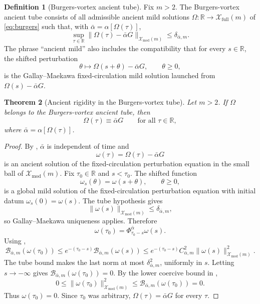 \documentclass[11pt]{amsart}
\theoremstyle{plain}
\newtheorem{theorem}{Theorem}[section]
\theoremstyle{definition}
\newtheorem{definition}[theorem]{Definition}
\theoremstyle{remark}
\numberwithin{equation}{section}
\begin{document}
\begin{definition}[Burgers-vortex ancient tube]\label{def:bv-tube}
Fix \(m>2\).  The Burgers-vortex ancient tube consists of all admissible
ancient mild solutions \(\Omega:\mathbb R\to\mathcal X_{\mathrm{full}}(m)\) of
\eqref{eq:burgers} such that, with
\(\bar\alpha=\alpha[\Omega(\tau)]\),
\[
   \sup_{\tau\in\mathbb R}
   \|\Omega(\tau)-\bar\alpha G\|_{\mathcal X_{\mathrm{mod}}(m)}
   \le
   \delta_{\bar\alpha,m}.
\]
The phrase ``ancient mild'' also includes the compatibility that for every
\(s\in\mathbb R\), the shifted perturbation
\[
   \theta\mapsto \Omega(s+\theta)-\bar\alpha G,\qquad \theta\ge0,
\]
is the Gallay--Maekawa fixed-circulation mild solution launched from
\(\Omega(s)-\bar\alpha G\).
\end{definition}

\begin{theorem}[Ancient rigidity in the Burgers-vortex tube]\label{thm:bv-rigid}
Let \(m>2\).  If \(\Omega\) belongs to the Burgers-vortex ancient tube, then
\[
   \Omega(\tau)\equiv\bar\alpha G
   \qquad\text{for all }\tau\in\mathbb R,
\]
where \(\bar\alpha=\alpha[\Omega(\tau)]\).
\end{theorem}

\begin{proof}
By , \(\bar\alpha\) is independent of time and
\[
   \omega(\tau)=\Omega(\tau)-\bar\alpha G
\]
is an ancient solution of the fixed-circulation perturbation equation in the
small ball of \(\mathcal X_{\mathrm{mod}}(m)\).  Fix \(\tau_0\in\mathbb R\)
and \(s<\tau_0\).  The shifted function
\[
   \omega_s(\theta)=\omega(s+\theta),\qquad \theta\ge0,
\]
is a global mild solution of the fixed-circulation perturbation equation with
initial datum \(\omega_s(0)=\omega(s)\).  The tube hypothesis gives
\[
   \|\omega(s)\|_{\mathcal X_{\mathrm{mod}}(m)}
   \le \delta_{\bar\alpha,m},
\]
so Gallay--Maekawa uniqueness applies.  Therefore
\[
   \omega(\tau_0)=\Phi_{\tau_0-s}^{\bar\alpha}\omega(s).
\]
Using ,
\[
   \mathcal B_{\bar\alpha,m}(\omega(\tau_0))
   \le
   e^{-(\tau_0-s)}
   \mathcal B_{\bar\alpha,m}(\omega(s))
   \le
   e^{-(\tau_0-s)}
   C_{\bar\alpha,m}^2
   \|\omega(s)\|_{\mathcal X_{\mathrm{mod}}(m)}^2 .
\]
The tube bound makes the last norm at most \(\delta_{\bar\alpha,m}^2\),
uniformly in \(s\).  Letting \(s\to-\infty\) gives
\(\mathcal B_{\bar\alpha,m}(\omega(\tau_0))=0\).  By the lower coercive bound
in ,
\[
   0\le
   \|\omega(\tau_0)\|_{\mathcal X_{\mathrm{mod}}(m)}^2
   \le
   \mathcal B_{\bar\alpha,m}(\omega(\tau_0))
   =
   0 .
\]
Thus \(\omega(\tau_0)=0\).  Since \(\tau_0\) was arbitrary,
\(\Omega(\tau)=\bar\alpha G\) for every \(\tau\).
\end{proof}
\end{document}
